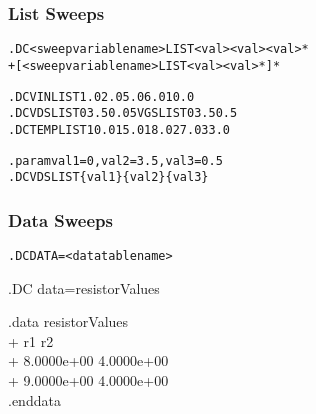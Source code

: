 \subsubsection{List Sweeps}
 

\begin{Command}
\format
\begin{alltt}
.DC <sweep variable name> LIST <val> <val> <val>*
+ [ <sweep variable name> LIST <val> <val>* ]*
\end{alltt}

\examples
\begin{alltt}
.DC VIN LIST 1.0 2.0 5.0 6.0 10.0 
.DC VDS LIST 0 3.5 0.05 VGS LIST 0 3.5 0.5
.DC TEMP LIST 10.0 15.0 18.0 27.0 33.0

.param val1=0, val2=3.5, val3=0.5
.DC VDS LIST \{val1\} \{val2\} \{val3\} 
\end{alltt}

\end{Command}


\subsubsection{Data Sweeps}
 

\begin{Command}
\format
\begin{alltt}
.DC DATA=<data table name> 
\end{alltt}

\examples
.DC data=resistorValues

.data resistorValues \\
+ r1   r2 \\
+ 8.0000e+00  4.0000e+00 \\
+ 9.0000e+00  4.0000e+00 \\
.enddata

\end{Command}
